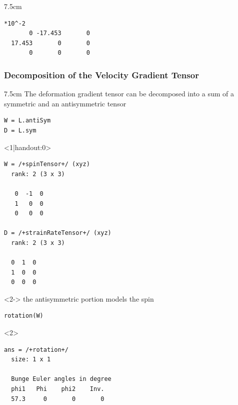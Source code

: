 \documentclass[compress,aspectratio=1610,fleqn]{beamer}
\begin{document}
\begin{frame}[fragile]
\begin{overlayarea}{\textwidth}{7.5cm}
\begin{onlyenv}
\begin{lstlisting}[style=output]
 *10^-2
       0 -17.453       0
  17.453       0       0
       0       0       0
\end{lstlisting}
    \end{onlyenv}
  \end{overlayarea}
\end{frame}


\begin{frame}[fragile]
  \frametitle{Decomposition of the Velocity Gradient Tensor}

  \begin{overlayarea}{\textwidth}{7.5cm}
    The deformation gradient tensor can be decomposed into a sum of a
    symmetric and an antisymmetric tensor
              \vspace{-0.2cm}
\begin{lstlisting}[style=input]
W = L.antiSym
D = L.sym
\end{lstlisting}
    \begin{onlyenv}<1|handout:0>
          \vspace{-0.3cm}
\begin{lstlisting}[style=output]
W = /+spinTensor+/ (xyz)
  rank: 2 (3 x 3)

   0  -1  0
   1   0  0
   0   0  0

D = /+strainRateTensor+/ (xyz)
  rank: 2 (3 x 3)

  0  1  0
  1  0  0
  0  0  0
\end{lstlisting}
    \end{onlyenv}

    \medskip

    \begin{onlyenv}<2->
      the antisymmetric portion models the spin
          \vspace{-0.2cm}
\begin{lstlisting}[style=input]
rotation(W)
\end{lstlisting}
    \end{onlyenv}
    \begin{onlyenv}<2>
      \vspace{-0.3cm}
\begin{lstlisting}[style=output]
ans = /+rotation+/
  size: 1 x 1

  Bunge Euler angles in degree
  phi1   Phi    phi2    Inv.
  57.3     0       0       0
\end{lstlisting}
    \end{onlyenv}
  \end{overlayarea}
\end{frame}
\end{document}
